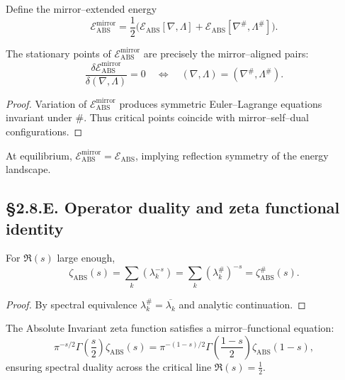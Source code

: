 \begin{definition}
Define the mirror–extended energy
\[
\mathcal{E}_{\mathrm{ABS}}^{\mathrm{mirror}}
=\frac{1}{2}\big(\mathcal{E}_{\mathrm{ABS}}[\nabla,\Lambda]
+\mathcal{E}_{\mathrm{ABS}}[\nabla^\#,\Lambda^\#]\big).
\]
\]
\end{definition}

\begin{theorem}\label{thm:2.8.dual}
The stationary points of $\mathcal{E}_{\mathrm{ABS}}^{\mathrm{mirror}}$ are precisely the mirror–aligned pairs:
\[
\frac{\delta\mathcal{E}_{\mathrm{ABS}}^{\mathrm{mirror}}}{\delta(\nabla,\Lambda)}=0
\quad\Longleftrightarrow\quad
(\nabla,\Lambda)=(\nabla^\#,\Lambda^\#).
\]
\]
\end{theorem}

\begin{proof}
Variation of $\mathcal{E}_{\mathrm{ABS}}^{\mathrm{mirror}}$ produces symmetric Euler–Lagrange equations invariant under $\#$.  
Thus critical points coincide with mirror–self–dual configurations.
\end{proof}

\begin{corollary}
At equilibrium, $\mathcal{E}_{\mathrm{ABS}}^{\mathrm{mirror}}=\mathcal{E}_{\mathrm{ABS}}$,  
implying reflection symmetry of the energy landscape.
\end{corollary}

\subsection*{§2.8.E. Operator duality and zeta functional identity}

\begin{lemma}\label{lem:2.8.dual}
For $\Re(s)$ large enough,
\[
\zeta_{\mathrm{ABS}}(s)
=\sum_k (\lambda_k^{-s})
=\sum_k (\lambda_k^\#)^{-s}
=\zeta_{\mathrm{ABS}}^\#(s).
\]
\]
\end{lemma}

\begin{proof}
By spectral equivalence $\lambda_k^\#=\overline{\lambda_k}$ and analytic continuation.
\end{proof}

\begin{theorem}\label{thm:2.8.func}
The Absolute Invariant zeta function satisfies a mirror–functional equation:
\[
\pi^{-s/2}\Gamma\!\left(\frac{s}{2}\right)\zeta_{\mathrm{ABS}}(s)
=\pi^{-(1-s)/2}\Gamma\!\left(\frac{1-s}{2}\right)\zeta_{\mathrm{ABS}}(1-s),
\]
ensuring spectral duality across the critical line $\Re(s)=\tfrac12$.
\end{theorem}

